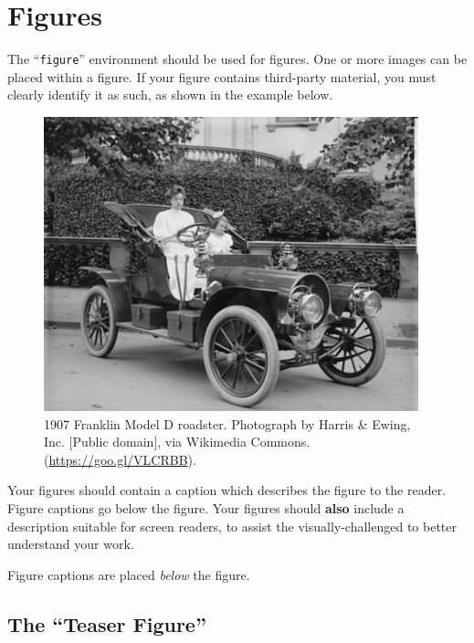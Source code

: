 \documentclass[sigconf]{acmart}
\begin{document}
\section{Figures}

The ``\verb|figure|'' environment should be used for figures. One or
more images can be placed within a figure. If your figure contains
third-party material, you must clearly identify it as such, as shown
in the example below.
\begin{figure}[h]
  \centering
  \includegraphics[width=\linewidth]{sample-franklin}
  \caption{1907 Franklin Model D roadster. Photograph by Harris \&
    Ewing, Inc. [Public domain], via Wikimedia
    Commons. (\url{https://goo.gl/VLCRBB}).}
\end{figure}

Your figures should contain a caption which describes the figure to
the reader. Figure captions go below the figure. Your figures should
{\bfseries also} include a description suitable for screen readers, to
assist the visually-challenged to better understand your work.

Figure captions are placed {\itshape below} the figure.

\subsection{The ``Teaser Figure''}
\end{document}
